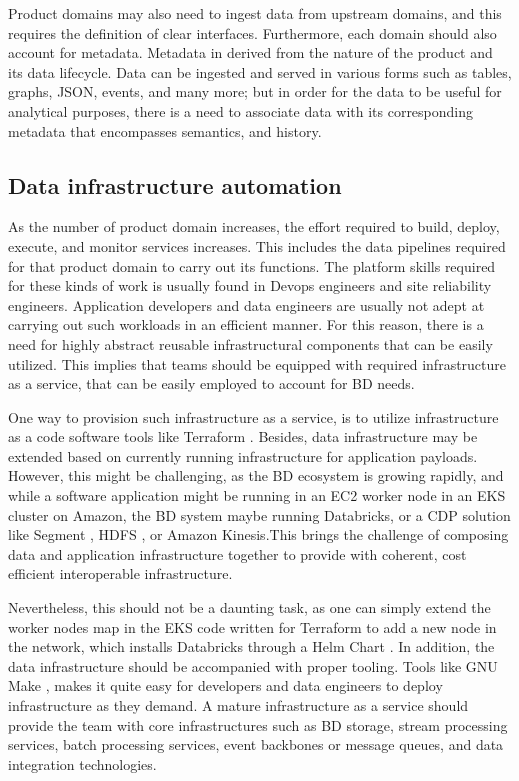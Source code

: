 \documentclass[review]{elsarticle}
\begin{document}
Product domains may also need to ingest data from upstream domains, and this requires the definition of clear interfaces. Furthermore, each domain should also account for metadata. Metadata in derived from the nature of the product and its data lifecycle. Data can be ingested and served in various forms such as tables, graphs, JSON, events, and many more; but in order for the data to be useful for analytical purposes, there is a need to associate data with its corresponding metadata that encompasses semantics, and history.

\subsection{Data infrastructure automation}

As the number of product domain increases, the effort required to build, deploy, execute, and monitor services increases. This includes the data pipelines required for that product domain to carry out its functions. The platform skills required for these kinds of work is usually found in Devops engineers and site reliability engineers. Application developers and data engineers are usually not adept at carrying out such workloads in an efficient manner. For this reason, there is a need for highly abstract reusable infrastructural components that can be easily utilized. This implies that teams should be equipped with required infrastructure as a service, that can be easily employed to account for BD needs.

One way to provision such infrastructure as a service, is to utilize infrastructure as a code software tools like Terraform \cite{Terraform}. Besides, data infrastructure may be extended based on currently running infrastructure for application payloads. However, this might be challenging, as the BD ecosystem is growing rapidly, and while a software application might be running in an EC2 worker node in an EKS cluster on Amazon, the BD system maybe running Databricks, or a CDP solution like Segment \cite{Segment}, HDFS \cite{HDFS}, or Amazon Kinesis.This brings the challenge of composing data and application infrastructure together to provide with coherent, cost efficient interoperable infrastructure.

Nevertheless, this should not be a daunting task, as one can simply extend the worker nodes map in the EKS code written for Terraform to add a new node in the network, which installs Databricks through a Helm Chart \cite{Helm}. In addition, the data infrastructure should be accompanied with proper tooling. Tools like GNU Make \cite{Make}, makes it quite easy for developers and data engineers to deploy infrastructure as they demand.
A mature infrastructure as a service should provide the team with core infrastructures such as BD storage, stream processing services, batch processing services, event backbones or message queues, and data integration technologies.
\end{document}
